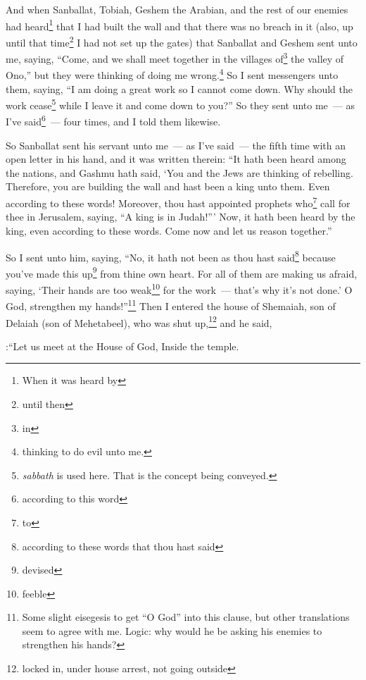 
\begin{inparaenum}
     And when Sanballat, Tobiah, Geshem the Arabian, and the rest of our enemies had heard\footnote{When it was heard by} that I had built the wall and that there was no breach in it (also, up until that time\footnote{until then} I had not set up the gates)%
     that Sanballat and Geshem sent unto me, saying, ``Come, and we shall meet together in the villages of\footnote{in} the valley of Ono,'' but they were thinking of doing me wrong.\footnote{thinking to do evil unto me.}%
     So I sent messengers unto them, saying, ``I am doing a great work so I cannot come down. Why should the work cease\footnote{\textit{sabbath} is used here. That is the concept being conveyed.} while I leave it and come down to you?''%
     So they sent unto me~--- as I've said\footnote{according to this word}~--- four times, and I told them likewise.%
    
     So Sanballat sent his servant unto me~--- as I've said~--- the fifth time with an open letter in his hand,%
     and it was written therein: ``It hath been heard among the nations, and Gashmu hath said, `You and the Jews are thinking of rebelling. Therefore, you are building the wall and hast been a king unto them. Even according to these words!%
     Moreover, thou hast appointed prophets who\footnote{to} call for thee in Jerusalem, saying, ``A king is in Judah!''' Now, it hath been heard by the king, even according to these words. Come now and let us reason together.''%
    
     So I sent unto him, saying, ``No, it hath not been as thou hast said\footnote{according to these words that thou hast said} because you've made this up\footnote{devised} from thine own heart.%
     For all of them are making us afraid, saying, `Their hands are too weak\footnote{feeble} for the work~--- that's why it's not done.' O God, strengthen my hands!''\footnote{Some slight eisegesis to get ``O God'' into this clause, but other translations seem to agree with me. Logic: why would he be asking his enemies to strengthen his hands?}%
     Then I entered the house of Shemaiah, son of Delaiah (son of Mehetabeel), who was shut up,\footnote{locked in, under house arrest, not going outside} and he said,

:``Let us meet at the House of God, Inside the temple.


\end{inparaenum}

